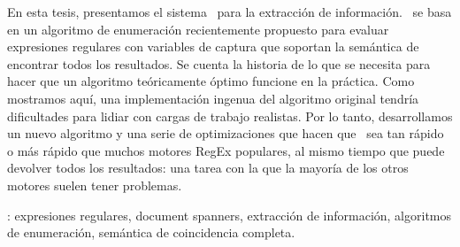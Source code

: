En esta tesis, presentamos el sistema \rematch\ para la extracción de
información. \rematch\ se basa en un algoritmo de enumeración recientemente
propuesto para evaluar expresiones regulares con variables de captura que
soportan la semántica de encontrar todos los resultados. Se cuenta la historia
de lo que se necesita para hacer que un algoritmo teóricamente óptimo funcione
en la práctica. Como mostramos aquí, una implementación ingenua del algoritmo
original tendría dificultades para lidiar con cargas de trabajo realistas. Por
lo tanto, desarrollamos un nuevo algoritmo y una serie de optimizaciones que
hacen que \rematch\ sea tan rápido o más rápido que muchos motores RegEx
populares, al mismo tiempo que puede devolver todos los resultados: una tarea
con la que la mayoría de los otros motores suelen tener problemas. \

\vfill
{}: expresiones regulares, document spanners,
extracción de información, algoritmos de enumeración, semántica de coincidencia
completa.

